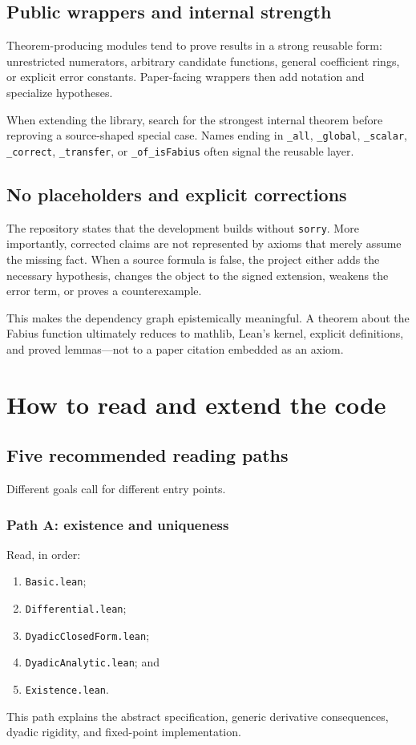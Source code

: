 \documentclass[11pt,oneside]{article}
\theoremstyle{definition}
\theoremstyle{remark}
\begin{document}
\subsection{Public wrappers and internal strength}
Theorem-producing modules tend to prove results in a strong reusable form: unrestricted numerators, arbitrary candidate functions, general coefficient rings, or explicit error constants.  Paper-facing wrappers then add notation and specialize hypotheses.

When extending the library, search for the strongest internal theorem before reproving a source-shaped special case.  Names ending in \nolinkurl{_all}, \nolinkurl{_global}, \nolinkurl{_scalar}, \nolinkurl{_correct}, \nolinkurl{_transfer}, or \nolinkurl{_of_isFabius} often signal the reusable layer.

\subsection{No placeholders and explicit corrections}
The repository states that the development builds without \nolinkurl{sorry}.  More importantly, corrected claims are not represented by axioms that merely assume the missing fact.  When a source formula is false, the project either adds the necessary hypothesis, changes the object to the signed extension, weakens the error term, or proves a counterexample.

This makes the dependency graph epistemically meaningful.  A theorem about the Fabius function ultimately reduces to mathlib, Lean's kernel, explicit definitions, and proved lemmas---not to a paper citation embedded as an axiom.

\section{How to read and extend the code}\label{ch:extending}

\subsection{Five recommended reading paths}
Different goals call for different entry points.

\subsubsection{Path A: existence and uniqueness}
Read, in order:
\begin{enumerate}
  \item \nolinkurl{Basic.lean};
  \item \nolinkurl{Differential.lean};
  \item \nolinkurl{DyadicClosedForm.lean};
  \item \nolinkurl{DyadicAnalytic.lean}; and
  \item \nolinkurl{Existence.lean}.
\end{enumerate}
This path explains the abstract specification, generic derivative consequences, dyadic rigidity, and fixed-point implementation.
\end{document}
